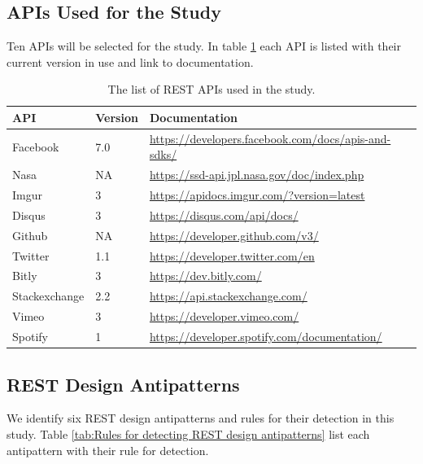\documentclass[a4paper,12pt]{article}
\begin{document}
\clearpage

\subsection{APIs Used for the Study}

Ten APIs will be selected for the study. In table \ref{tab:APIs used in the research} each API is listed with their current version in use and link to documentation.

\begin{center}
\begin{table}[!ht]
\begin{tabular}{|p{30mm}|p{15mm}|p{85mm}|}
\hline \textbf{API} & \textbf{Version} & \textbf{Documentation} \\
\hline 
Facebook &
7.0 & 
\url{https://developers.facebook.com/docs/apis-and-sdks/} 
\\ \hline
Nasa &
NA &
\url{https://ssd-api.jpl.nasa.gov/doc/index.php}
\\ \hline
Imgur &
3 & 
\url{https://apidocs.imgur.com/?version=latest}
\\ \hline
Disqus &
3 & 
\url{https://disqus.com/api/docs/}
\\ \hline
Github &
NA & 
\url{https://developer.github.com/v3/}
\\ \hline
Twitter &
1.1 & 
\url{https://developer.twitter.com/en}
\\ \hline
Bitly &
3 & 
\url{https://dev.bitly.com/}
\\ \hline
Stackexchange &
2.2 & 
\url{https://api.stackexchange.com/}
\\ \hline
Vimeo &
3 & 
\url{https://developer.vimeo.com/}
\\ \hline
Spotify &
1 & 
\url{https://developer.spotify.com/documentation/}
\\ \hline
\end{tabular}
    \caption{The list of REST APIs used in the study.}
    \label{tab:APIs used in the research}
\end{table}
\end{center}

\subsection{REST Design Antipatterns}

We identify six REST design antipatterns and rules for their detection in this study. Table \ref{tab:Rules for detecting REST design antipatterns} list each antipattern with their rule for detection.
\end{document}
